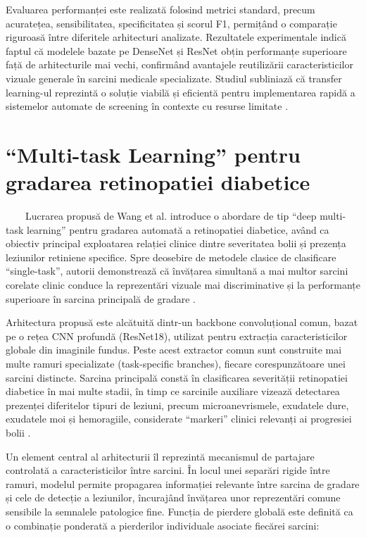 \documentclass[12pt, a4paper, twoside, romanian]{teza-upb}
\begin{document}
Evaluarea performanței este realizată folosind metrici standard, precum acuratețea,
sensibilitatea, specificitatea și scorul F1, permițând o comparație riguroasă între diferitele arhitecturi
analizate. Rezultatele experimentale indică faptul că modelele bazate pe DenseNet și ResNet obțin
performanțe superioare față de arhitecturile mai vechi, confirmând avantajele reutilizării caracteristicilor
vizuale generale în sarcini medicale specializate. Studiul subliniază că transfer learning-ul reprezintă o
soluție viabilă și eficientă pentru implementarea rapidă a sistemelor automate de screening în contexte
cu resurse limitate \cite{10_jabbar2022transfer}.

\section{“Multi-task Learning” pentru gradarea retinopatiei diabetice \cite{6_wang2021deep}}

\ \ \ \ Lucrarea propusă de Wang et al. \cite{6_wang2021deep} introduce o abordare de tip
“deep multi-task learning”
pentru gradarea automată a retinopatiei diabetice, având ca obiectiv principal exploatarea relației clinice
dintre severitatea bolii și prezența leziunilor retiniene specifice. Spre deosebire de metodele clasice de
clasificare “single-task”, autorii demonstrează că învățarea simultană a mai multor sarcini corelate clinic
conduce la reprezentări vizuale mai discriminative și la performanțe superioare în sarcina principală de
gradare \cite{6_wang2021deep}.
\bigskip

Arhitectura propusă este alcătuită dintr-un backbone convoluțional comun, bazat pe o rețea CNN
profundă (ResNet18), utilizat pentru extracția caracteristicilor globale din imaginile fundus. Peste acest
extractor comun sunt construite mai multe ramuri specializate (task-specific branches), fiecare 
corespunzătoare unei sarcini distincte. Sarcina principală constă în clasificarea severității retinopatiei
diabetice în mai multe stadii, în timp ce sarcinile auxiliare vizează detectarea prezenței diferitelor tipuri
de leziuni, precum microanevrismele, exudatele dure, exudatele moi și hemoragiile, considerate
“markeri” clinici relevanți ai progresiei bolii \cite{6_wang2021deep}.
\bigskip

Un element central al arhitecturii îl reprezintă mecanismul de partajare controlată a
caracteristicilor între sarcini. În locul unei separări rigide între ramuri, modelul permite propagarea
informației relevante între sarcina de gradare și cele de detecție a leziunilor, încurajând învățarea unor
reprezentări comune sensibile la semnalele patologice fine. Funcția de pierdere globală este definită ca o
combinație ponderată a pierderilor individuale asociate fiecărei sarcini:
\end{document}
